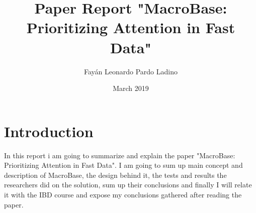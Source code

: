 \documentclass[11pt, letterpaper]{report}
\title{Paper Report "MacroBase: Prioritizing Attention in Fast Data"}
\author{Fayán Leonardo Pardo Ladino}
\date{March 2019}
\begin{document}
	\maketitle
	\chapter{Introduction}
	\begin{flushleft}
		In this report i am going to summarize and explain the paper "MacroBase: Prioritizing Attention in Fast Data". I am going to sum up main concept and description of MacroBase, the design behind it, the tests and results the researchers did on the solution, sum up their conclusions and finally I will relate it with the IBD course and expose my conclusions gathered after reading the paper.
	\end{flushleft}
\end{document}
